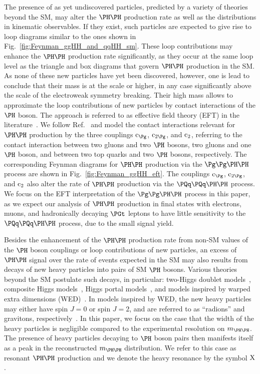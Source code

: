 The presence of as yet undiscovered particles, predicted by a variety of theories beyond the SM, may alter the $\HH$ production rate
as well as the distributions in kinematic observables.
If they exist, such particles are expected to give rise to loop diagrams similar to the ones shown in Fig.~\ref{fig:Feynman_ggHH_and_qqHH_sm}.
These loop contributions may enhance the $\HH$ production rate significantly,
as they occur at the same loop level as the triangle and box diagrams that govern $\HH$ production in the SM.
As none of these new particles have yet been discovered, however, one is lead to conclude that their mass is at the \TeV scale or higher,
in any case significantly above the scale of the electroweak symmetry breaking.
Their high mass allows to approximate the loop contributions of new particles by contact interactions of the $\PHiggs$ boson.
The approach is referred to as effective field theory (EFT) in the literature~\cite{Buchmuller:1985jz,Grzadkowski:2010es}.
We follow Ref.~\cite{Carvalho:2015ttv} and model the contact interactions relevant for $\HH$ production by the three couplings $\cg$, $\cgg$, and $\text{c}_{2}$,
referring to the contact interaction between two gluons and two $\PHiggs$ bosons, two gluons and one $\PHiggs$ boson, 
and between two top quarks and two $\PHiggs$ bosons, respectively.
The corresponding Feynman diagrams for $\HH$ production via the $\ggHH$ process are shown in Fig.~\ref{fig:Feynman_ggHH_eft}.
The couplings $\cg$, $\cgg$, and $\text{c}_{2}$ also alter the rate of $\HH$ production via the $\qqHH$ process.
We focus on the EFT interpretation of the $\ggHH$ process in this paper,
as we expect our analysis of $\HH$ production in final states with electrons, muons, and hadronically decaying $\PGt$ leptons
to have little sensitivity to the $\qqHH$ process, due to the small signal yield.

Besides the enhancement of the $\HH$ production rate from non-SM values of the $\PHiggs$ boson couplings or loop contributions of new particles,
an excess of $\HH$ signal over the rate of events expected in the SM may also results from decays of new heavy particles into pairs of SM $\PHiggs$ bosons.
Various theories beyond the SM postulate such decays, in particular:
two-Higgs doublet models~\cite{Craig:2013hca,Nhung:2013lpa},
composite Higgs models~\cite{Grober:2010yv,Contino:2010mh}, Higgs portal models~\cite{Englert:2011yb,No:2013wsa},
and models inspired by warped extra dimensions (WED)~\cite{Randall:1999ee}.
In models inspired by WED, the new heavy particles may either have spin $J=0$ or spin $J=2$,
and are referred to as ``radions'' and gravitons, respectively~\cite{Cheung:2000rw}.
In this paper, we focus on the case that the width of the heavy particles is negligible compared to the experimental resolution on $\mHH$.
The presence of heavy particles decaying to $\PHiggs$ boson pairs then manifests itself as a peak in the reconstructed $\mHH$ distribution.
We refer to this case as resonant $\HH$ production and we denote the heavy resonance by the symbol $\textrm{X}$.

